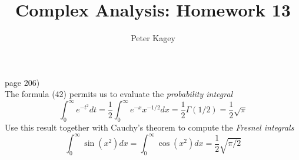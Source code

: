 \documentclass{article}
\newenvironment{problem}[2][Problem]{\begin{trivlist}
\item[\hskip \labelsep {\bfseries #1}\hskip \labelsep {\bfseries #2.}]}{\end{trivlist}}
\begin{document}
\title{Complex Analysis: Homework 13}
\author{Peter Kagey}

\maketitle

\begin{problem}{3} (page 206) \\
  The formula (42) permits us to evaluate the \textit{probability integral} \[
    \int_0^\infty e^{-t^2} dt
      = \frac{1}{2} \int_0^\infty e^{-x}x^{-1/2} dx
      = \frac{1}{2} \Gamma(1/2)
      = \frac{1}{2} \sqrt{\pi}
  \]
  Use this result together with Cauchy's theorem to compute the
  \textit{Fresnel integrals} \[
    \int_0^\infty \sin(x^2) dx
    = \int_0^\infty \cos(x^2) dx
    = \frac{1}{2}\sqrt{\pi/2}
  \]
\end{problem}
\end{document}
